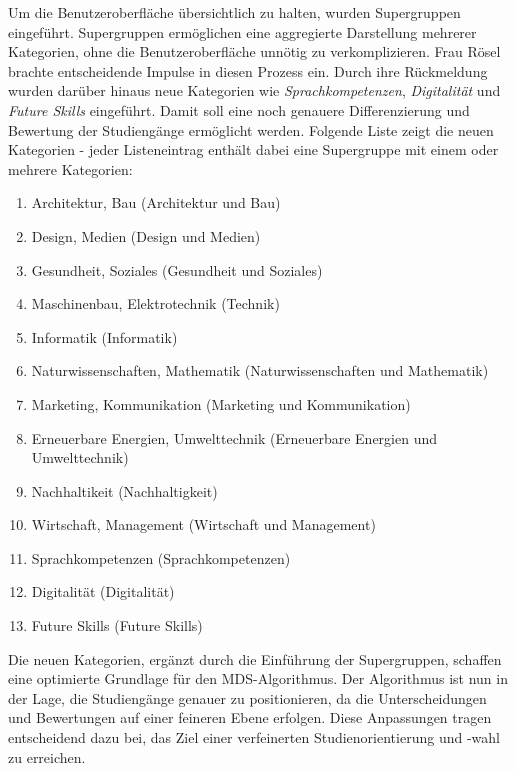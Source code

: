 Um die Benutzeroberfläche übersichtlich zu halten, wurden Supergruppen eingeführt. Supergruppen ermöglichen eine aggregierte Darstellung mehrerer Kategorien, ohne die Benutzeroberfläche unnötig zu verkomplizieren. Frau Rösel brachte entscheidende Impulse in diesen Prozess ein. Durch ihre Rückmeldung wurden darüber hinaus neue Kategorien wie \textit{Sprachkompetenzen}, \textit{Digitalität} und \textit{Future Skills} eingeführt. Damit soll eine noch genauere Differenzierung und Bewertung der Studiengänge ermöglicht werden. Folgende Liste zeigt die neuen Kategorien - jeder Listeneintrag enthält dabei eine Supergruppe mit einem oder mehrere Kategorien:

\begin{enumerate}
    \item Architektur, Bau (Architektur und Bau)
    \item Design, Medien (Design und Medien)
    \item Gesundheit, Soziales (Gesundheit und Soziales)
    \item Maschinenbau, Elektrotechnik (Technik)
    \item Informatik (Informatik)
    \item Naturwissenschaften, Mathematik (Naturwissenschaften und Mathematik)
    \item Marketing, Kommunikation (Marketing und Kommunikation)
    \item Erneuerbare Energien, Umwelttechnik (Erneuerbare Energien und
    Umwelttechnik)
    \item Nachhaltikeit (Nachhaltigkeit)
    \item Wirtschaft, Management (Wirtschaft und Management)
    \item Sprachkompetenzen (Sprachkompetenzen)
    \item Digitalität (Digitalität)
    \item Future Skills (Future Skills)
\end{enumerate}

Die neuen Kategorien, ergänzt durch die Einführung der Supergruppen, schaffen eine optimierte Grundlage für den MDS-Algorithmus. Der Algorithmus ist nun in der Lage, die Studiengänge genauer zu positionieren, da die Unterscheidungen und Bewertungen auf einer feineren Ebene erfolgen. Diese Anpassungen tragen entscheidend dazu bei, das Ziel einer verfeinerten Studienorientierung und -wahl zu erreichen.